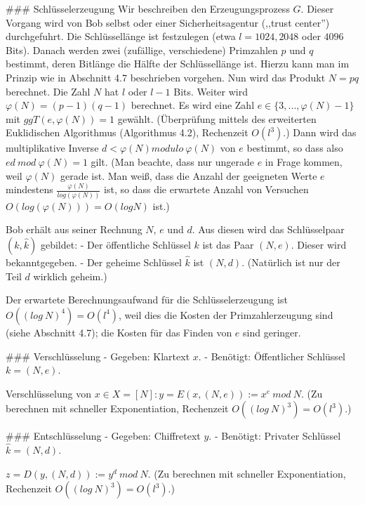 \documentclass[a4paper]{article}
\begin{document}
\begin{multicols}{3}
{{{                ### Schlüsselerzeugung
                Wir beschreiben den Erzeugungsprozess $G$. Dieser Vorgang wird von Bob selbst oder einer Sicherheitsagentur (,,trust center'') durchgefuhrt. Die Schlüssellänge ist festzulegen (etwa $l= 1024, 2048$ oder $4096$ Bits). Danach werden zwei (zufällige, verschiedene) Primzahlen $p$ und $q$ bestimmt, deren Bitlänge die Hälfte der Schlüssellänge ist.
                Hierzu kann man im Prinzip wie in Abschnitt 4.7 beschrieben vorgehen. Nun wird das Produkt $N=pq$ berechnet. Die Zahl $N$ hat $l$ oder $l-1$ Bits. Weiter wird $\varphi(N) = (p-1)(q-1)$ berechnet. Es wird eine Zahl $e\in\{3,...,\varphi(N)-1\}$ mit $ggT(e,\varphi(N)) = 1$ gewählt. (Überprüfung mittels des erweiterten Euklidischen Algorithmus (Algorithmus 4.2), Rechenzeit $O(l^3)$.) Dann wird das multiplikative Inverse $d<\varphi(N) modulo\ \varphi(N)$ von $e$ bestimmt, so dass also $ed\ mod\ \varphi(N) = 1$ gilt. (Man beachte, dass nur ungerade $e$ in Frage kommen, weil $\varphi(N)$ gerade ist. Man weiß, dass die Anzahl der geeigneten Werte $e$ mindestens $\frac{\varphi(N)}{log(\varphi(N))}$ ist, so dass die erwartete Anzahl von Versuchen $O(log(\varphi(N)))=O(logN)$ ist.)

                Bob erhält aus seiner Rechnung $N$, $e$ und $d$. Aus diesen wird das Schlüsselpaar $(k,\hat{k})$ gebildet:
                - Der öffentliche Schlüssel $k$ ist das Paar $(N,e)$. Dieser wird bekanntgegeben.
                - Der geheime Schlüssel $\hat{k}$ ist $(N,d)$. (Natürlich ist nur der Teil $d$ wirklich geheim.)

                Der erwartete Berechnungsaufwand für die Schlüsselerzeugung ist $O((log\ N)^4) =O(l^4)$, weil dies die Kosten der Primzahlerzeugung sind (siehe Abschnitt 4.7); die Kosten für das Finden von $e$ sind geringer.

                ### Verschlüsselung
                - Gegeben: Klartext $x$.
                - Benötigt: Öffentlicher Schlüssel $k= (N,e)$.

                Verschlüsselung von $x\in X= [N]: y=E(x,(N,e)) :=x^e\ mod\ N$. (Zu berechnen mit schneller Exponentiation, Rechenzeit $O((log\ N)^3) =O(l^3)$.)

                ### Entschlüsselung
                - Gegeben: Chiffretext $y$.
                - Benötigt: Privater Schlüssel $\hat{k}= (N,d)$.

            $z=D(y,(N,d)) :=y^d\ mod\ N$. (Zu berechnen mit schneller Exponentiation, Rechenzeit $O((log\ N)^3) =O(l^3)$.)

}}}
\end{multicols}
\end{document}
